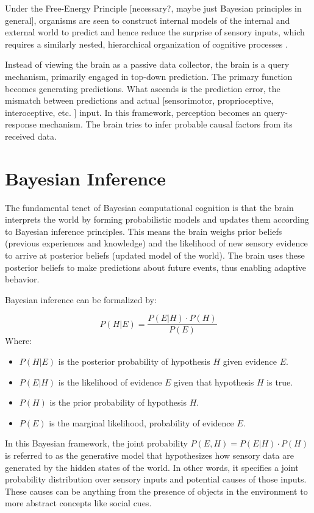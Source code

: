Under the Free-Energy Principle [necessary?, maybe just Bayesian principles in general], organisms are seen to construct internal models of the internal and external world to predict and hence reduce the surprise of sensory inputs, which requires a similarly nested, hierarchical organization of cognitive processes \cite{friston_free-energy_2010, friston_world_2021}. 

Instead of viewing the brain as a passive data collector, the brain is a query mechanism, primarily engaged in top-down prediction. The primary function becomes generating predictions. What ascends is the prediction error, the mismatch between predictions and actual [sensorimotor, proprioceptive, interoceptive, etc. ] input. In this framework, perception becomes an query-response mechanism. The brain tries to infer probable causal factors from its received data.

\section{Bayesian Inference}

The fundamental tenet of Bayesian computational cognition is that the brain interprets the world by forming probabilistic models and updates them according to Bayesian inference principles. This means the brain weighs prior beliefs (previous experiences and knowledge) and the likelihood of new sensory evidence to arrive at posterior beliefs (updated model of the world). The brain uses these posterior beliefs to make predictions about future events, thus enabling adaptive behavior.

Bayesian inference can be formalized by:

\[ P(H \vert E) = \frac{P(E \vert H) \cdot P(H)}{P(E)} \]
Where:
\begin{itemize}
    \item \( P(H \vert E) \) is the posterior probability of hypothesis \( H \) given evidence \( E \).
    \item \( P(E \vert H) \) is the likelihood of evidence \( E \) given that hypothesis \( H \) is true.
    \item \( P(H) \) is the prior probability of hypothesis \( H \).
    \item \( P(E) \) is the marginal likelihood, probability of evidence \( E \).
\end{itemize}

In this Bayesian framework, the joint probability \( P(E, H) = P(E \vert H) \cdot P(H) \) is referred to as the generative model that hypothesizes how sensory data are generated by the hidden states of the world. In other words, it specifies a joint probability distribution over sensory inputs and potential causes of those inputs. These causes can be anything from the presence of objects in the environment to more abstract concepts like social cues.

